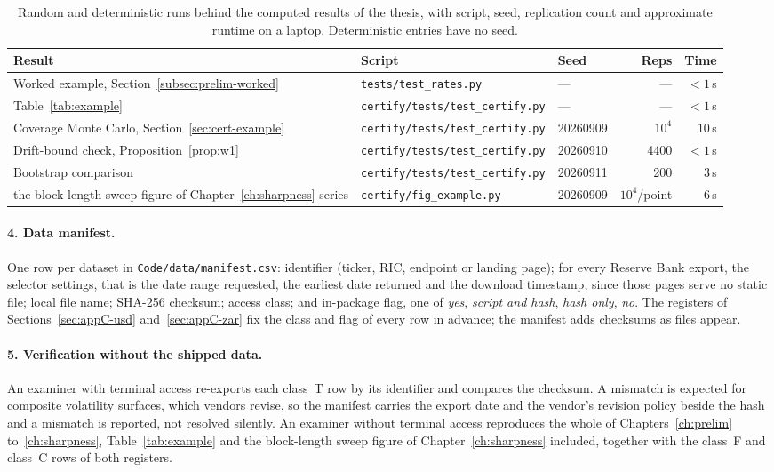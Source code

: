 \documentclass[../../main.tex]{subfiles}
\begin{document}
\begin{table}[htbp]\centering\small
\caption{Random and deterministic runs behind the computed results of the thesis, with script, seed, replication count and approximate runtime on a laptop. Deterministic entries have no seed.}\label{tab:appC-seeds}
\begin{tabular}{@{}p{4.3cm}p{4.6cm}p{1.9cm}rr@{}}
\toprule
Result & Script & Seed & Reps & Time \\
\midrule
Worked example, Section~\ref{subsec:prelim-worked} & \texttt{tests/test\_rates.py} & --- & --- & $<1$\,s \\
Table~\ref{tab:example} & \texttt{certify/tests/test\_certify.py} & --- & --- & $<1$\,s \\
Coverage Monte Carlo, Section~\ref{sec:cert-example} & \texttt{certify/tests/test\_certify.py} & 20260909 & $10^4$ & $10$\,s \\
Drift-bound check, Proposition~\ref{prop:w1} & \texttt{certify/tests/test\_certify.py} & 20260910 & 4400 & $<1$\,s \\
Bootstrap comparison & \texttt{certify/tests/test\_certify.py} & 20260911 & 200 & $3$\,s \\
the block-length sweep figure of Chapter~\ref{ch:sharpness} series & \texttt{certify/fig\_example.py} & 20260909 & $10^4$/point & $6$\,s \\
\bottomrule
\end{tabular}
\end{table}

\paragraph{4. Data manifest.} One row per dataset in \texttt{Code/data/manifest.csv}: identifier (ticker, RIC, endpoint or landing page); for every Reserve Bank export, the selector settings, that is the date range requested, the earliest date returned and the download timestamp, since those pages serve no static file; local file name; SHA-256 checksum; access class; and in-package flag, one of \emph{yes}, \emph{script and hash}, \emph{hash only}, \emph{no}. The registers of Sections~\ref{sec:appC-usd} and~\ref{sec:appC-zar} fix the class and flag of every row in advance; the manifest adds checksums as files appear.

\paragraph{5. Verification without the shipped data.} An examiner with terminal access re-exports each class~T row by its identifier and compares the checksum. A mismatch is expected for composite volatility surfaces, which vendors revise, so the manifest carries the export date and the vendor's revision policy beside the hash and a mismatch is reported, not resolved silently. An examiner without terminal access reproduces the whole of Chapters~\ref{ch:prelim} to~\ref{ch:sharpness}, Table~\ref{tab:example} and the block-length sweep figure of Chapter~\ref{ch:sharpness} included, together with the class~F and class~C rows of both registers.
\end{document}
